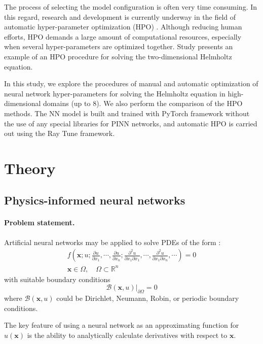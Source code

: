 \documentclass[reprint,
superscriptaddress,
amsmath,amssymb,aps,showkeys,showpacs,
twoside,final,secnumarabic,%
nofootinbib]{revtex4-2}
\begin{document}
The process of selecting the model configuration is often very time consuming. In this regard, research and development is currently underway in the field of automatic hyper-parameter optimization (HPO) \cite{bib10}. Although reducing human efforts, HPO demands a large amount of computational resources, especially when several hyper-parameters are optimized together. Study \cite{bib11} presents an example of an HPO procedure for solving the two-dimensional Helmholtz equation.

In this study, we explore the procedures of manual and automatic optimization of neural network hyper-parameters for solving the Helmholtz equation in high-dimensional domains (up to 8). We also perform the comparison of the HPO methods. The NN model is built and trained with PyTorch framework without the use of any special libraries for PINN networks, and automatic HPO is carried out using the Ray Tune framework.

\section{Theory}

\subsection{Physics-informed neural networks}

\paragraph{Problem statement.}
Artificial neural networks may be applied to solve PDEs of the form \cite{bib08}:
\begin{gather*}
f \left(\mathbf{x}; u; \frac{\partial u}{\partial x_1}, \cdots, \frac{\partial u}{\partial x_n}; \frac{\partial^2 u}{\partial x_1 \partial x_1}, \cdots, \frac{\partial^2 u}{\partial x_1 \partial x_n}, \cdots \right) = 0\\
\mathbf{x} \in \Omega, \quad \Omega \subset \mathbb{R}^n
\end{gather*}
with suitable boundary conditions
\[\mathcal{B}(\mathbf{x}, u)|_{\partial \Omega} = 0\]
where $\mathcal{B}(\mathbf{x}, u)$ could be Dirichlet, Neumann, Robin, or periodic boundary conditions.

The key feature of using a neural network as an approximating function for $u(\mathbf{x})$ is the ability to analytically calculate derivatives with respect to $\mathbf{x}$.
\end{document}
